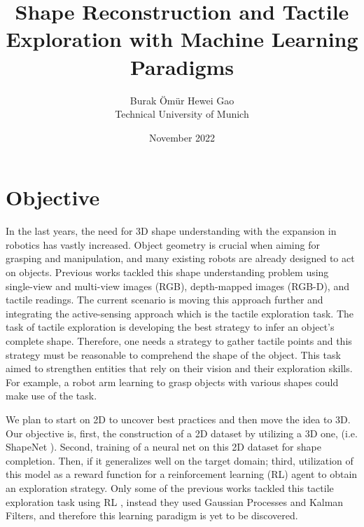 \documentclass[conference]{IEEEtran}
\begin{document}
\title{Shape Reconstruction and Tactile Exploration with Machine Learning Paradigms}
\date{November 2022}

\author{Burak Ömür \hspace{1em}  Hewei Gao\\
Technical University of Munich\\}


\maketitle
\section{Objective}
In the last years, the need for 3D shape understanding with the expansion in robotics has vastly increased. Object geometry is crucial when aiming for grasping and manipulation, \cite{https://doi.org/10.48550/arxiv.1803.07671} and many existing robots are already designed to act on objects. Previous works tackled this shape understanding problem using single-view and multi-view images (RGB), depth-mapped images (RGB-D), and tactile readings. The current scenario is moving this approach further and integrating the active-sensing approach \cite{https://doi.org/10.48550/arxiv.2107.09584} which is the tactile exploration task. The task of tactile exploration is developing the best strategy to infer an object's complete shape.  Therefore, one needs a strategy to gather tactile points and this strategy must be reasonable to comprehend the shape of the object. This task aimed to strengthen entities that rely on their vision and their exploration skills. For example, a robot arm learning to grasp objects with various shapes could make use of the task.

We plan to start on 2D to uncover best practices and then move the idea to 3D. Our objective is, first, the construction of a 2D dataset by utilizing a 3D one, (i.e. ShapeNet \cite{https://doi.org/10.48550/arxiv.1512.03012}). Second, training of a neural net on this 2D dataset for shape completion. Then, if it generalizes well on the target domain; third, utilization of this model as a reward function for a reinforcement learning (RL) agent to obtain an exploration strategy. Only some of the previous works tackled this tactile exploration task using RL \cite{Fleer2020}, instead they used Gaussian Processes and Kalman Filters\cite{6631074, 7803275, 8793773}, and therefore this learning paradigm is yet to be discovered.
\end{document}
